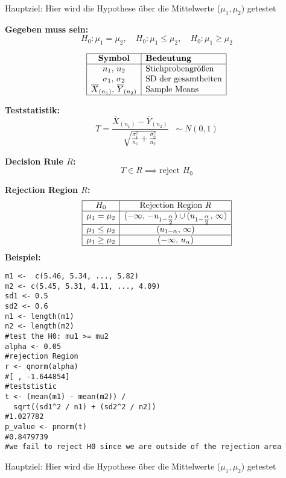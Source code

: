 \begin{center}

\columnbreak
{}

Hauptziel: Hier wird die Hypothese über die
Mittelwerte ($\mu_1, \mu_2$) getestet
\end{center}

\begin{center}
\end{center}

\large{\textbf{Gegeben muss sein:}}
\[
H_0: \mu_1 = \mu_2, \quad 
H_0: \mu_1 \leq \mu_2, \quad 
H_0: \mu_1 \geq \mu_2
\]

\[
\begin{array}{|c|l|}
\hline
\textbf{Symbol} & \textbf{Bedeutung} \\
\hline
n_1,\,n_2 & \text{Stichprobengrößen} \\
\sigma_1,\,\sigma_2 & \text{SD der gesamtheiten} \\
\overline{X}_{(n_1)},\,\overline{Y}_{(n_2)} & \text{Sample Means} \\
\hline
\end{array}
\]

\normalsize

\large{\textbf{Teststatistik:}}
\[
T = \frac{\overline{X}_{(n_1)} - \overline{Y}_{(n_2)}}
{\sqrt{\frac{\sigma_1^2}{n_1} + \frac{\sigma_2^2}{n_2}}}
\;\;\sim N(0,1)
\]

\large{\textbf{Decision Rule \(R\):}}
\[
T \in R \implies \text{reject } H_0
\]

\large{\textbf{Rejection Region \(R\):}}
\[
\begin{array}{|c|c|}
\hline
H_0 & \text{Rejection Region } R \\ \hline
\mu_1 = \mu_2 
  & (-\infty,\,-u_{1-\tfrac{\alpha}{2}})\cup(u_{1-\tfrac{\alpha}{2}},\,\infty) \\ \hline
\mu_1 \leq \mu_2 
  & (u_{1-\alpha},\,\infty) \\ \hline
\mu_1 \geq \mu_2 
  & (-\infty,\,u_{\alpha}) \\ \hline
\end{array}
\]
\large{\textbf{Beispiel:}}
\begin{lstlisting} 
m1 <-  c(5.46, 5.34, ..., 5.82)
m2 <- c(5.45, 5.31, 4.11, ..., 4.09)
sd1 <- 0.5
sd2 <- 0.6
n1 <- length(m1)
n2 <- length(m2)
#test the H0: mu1 >= mu2
alpha <- 0.05
#rejection Region
r <- qnorm(alpha)
#[ , -1.644854]
#teststistic
t <- (mean(m1) - mean(m2)) / 
  sqrt((sd1^2 / n1) + (sd2^2 / n2))
#1.027782
p_value <- pnorm(t) 
#0.8479739
#we fail to reject H0 since we are outside of the rejection area
\end{lstlisting}
\columnbreak
\normalsize
\begin{center}
\normalsize
Hauptziel: Hier wird die Hypothese über die
Mittelwerte ($\mu_1, \mu_2$) getestet
\end{center}
\normalsize
\begin{center}
\end{center}

